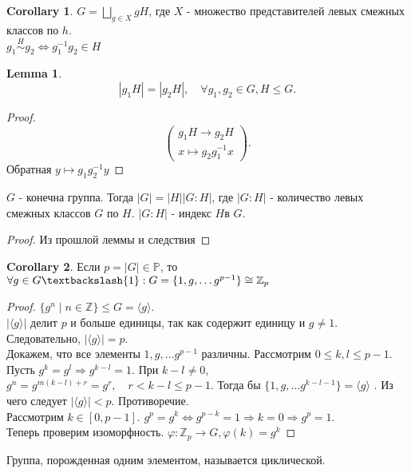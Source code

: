 \documentclass[11pt]{book}
\newcommand{\Z}{\mathbb{Z}}
\newcommand{\Pm}{\mathbb{P}}
\theoremstyle{definition}
\theoremstyle{plain}
\theoremstyle{plain}
\newtheorem*{lm}{Lemma}
\theoremstyle{definition}
\newtheorem*{cor}{Corollary}
\theoremstyle{remark}
\begin{document}
\begin{cor}
    $G =\bigsqcup\limits_{g \in X} g H $, где $X$ - множество представителей левых смежных классов по $h$. \\
    $g_1 \stackrel{H}\sim g_2 \Leftrightarrow g_1^{-1} g_2 \in H$
\end{cor}
\begin{lm}
    \[
    |g_1H| = |g_2H|, \quad \forall g_1, g_2 \in  G, H \le G 
    .\] 
\end{lm}
\begin{proof}
     \[
     \left ( 
     \begin{array}{c}
     g_1H \to g_2H \\
     x \mapsto g_2 g_1^{-1} x
     \end{array}
     \right )
     .\] 
     Обратная $y \mapsto g_1 g_2^{-1} y$
\end{proof}
\begin{thm}[Лагранж]
    $G$ - конечна группа. Тогда $|G| = |H| |G:H|$, где $|G:H|$ - количество левых смежных классов $G$ по $H$. $|G:H|$ - индекс $H$в $G$.
\end{thm}
\begin{proof}
    Из прошлой леммы и следствия
\end{proof}
\begin{cor}
    Если $p = |G| \in  \Pm$, то $\forall g \in  G \textbackslash {1}: G = \{1, g, \ldots g^{p-1}\} \cong \Z_p$
\end{cor}
\begin{proof}
    $\{g^n\mid n \in  \Z\} \le G = \langle g \rangle$. \\
    $|\langle g \rangle|$ делит $p$ и больше единицы, так как содержит единицу и $g \ne 1$. Следовательно, $|\langle g \rangle|=p$. \\
    Докажем, что все элементы $1, g, \ldots g^{p-1}$ различны. Рассмотрим $0 \le k, l \le p -1$.
    Пусть $g^k = g^l \Rightarrow g^{k-l} = 1$. При $k - l \ne 0$, $g^n = g^{m(k-l) + r} = g^r, \quad r < k -l \le p-1$. 
    Тогда бы $\{1, g, \ldots g^{k-l-1}\} = \langle g \rangle$ . Из чего следует $| \langle g \rangle| < p$. Противоречие.\\
    Рассмотрим $k \in  [0, p-1]$.
    $g^p = g^k \Leftrightarrow g^{p-k} = 1 \Rightarrow k = 0 \Rightarrow g^p = 1$.\\
    Теперь проверим изоморфность.
    $\varphi : \Z_p \to G, \varphi (k) = g^k$
\end{proof}
\begin{defn}
    Группа, порожденная одним элементом, называется циклической.
\end{defn}
\end{document}
